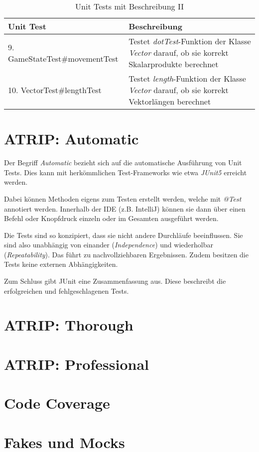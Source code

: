 \begin{table}[H]
    \centering
    \begin{tabular}{|p{8cm}|p{8cm}|}
      \hline
      \textbf{Unit Test} & \textbf{Beschreibung} \\
      \hline
      9. GameStateTest\#movementTest & Testet \textit{dotTest}-Funktion der Klasse \textit{Vector} darauf, ob sie korrekt Skalarprodukte berechnet \\
      \hline
      10. VectorTest\#lengthTest & Testet \textit{length}-Funktion der Klasse \textit{Vector} darauf, ob sie korrekt Vektorlängen berechnet \\
      \hline
    \end{tabular}
    \caption{Unit Tests mit Beschreibung II}
\end{table}

\section{ATRIP: Automatic}
Der Begriff \textit{Automatic} bezieht sich auf die automatische
Ausführung von Unit Tests. Dies kann mit herkömmlichen Test-Frameworks
wie etwa \textit{JUnit5} erreicht werden. 

Dabei können Methoden eigens zum Testen erstellt werden, welche mit
\textit{@Test} annotiert werden. Innerhalb der IDE (z.B. IntelliJ)
können sie dann über einen Befehl oder Knopfdruck einzeln oder im
Gesamten ausgeführt werden.

Die Tests sind so konzipiert, dass sie nicht andere Durchläufe beeinflussen.
Sie sind also unabhängig von einander (\textit{Independence}) und 
wiederholbar (\textit{Repeatability}). Das führt zu nachvollziehbaren
Ergebnissen. Zudem besitzen die Tests keine externen Abhängigkeiten.

Zum Schluss gibt JUnit eine Zusammenfassung aus. Diese beschreibt die
erfolgreichen und fehlgeschlagenen Tests.

\section{ATRIP: Thorough}

\section{ATRIP: Professional}

\section{Code Coverage}

\section{Fakes und Mocks}
